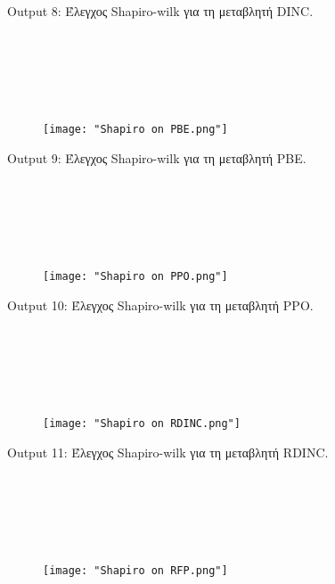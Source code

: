\documentclass[10pt]{article}
\begin{document}
\begin{centering}

\renewcommand{\caption}{Output 8: }
\caption {Έλεγχος Shapiro-wilk για τη μεταβλητή DINC. }
\end{centering}

\

\

\

\begin{figure}[H]
    \centering
    \texttt{[image: "Shapiro on PBE.png"]}
    
    \label{fig:galaxy}
\end{figure}

\begin{centering}

\renewcommand{\caption}{Output 9: }
\caption {Έλεγχος Shapiro-wilk για τη μεταβλητή PBE. }
\end{centering}

\

\

\


\begin{figure}[H]
    \centering
    \texttt{[image: "Shapiro on PPO.png"]}
    
    \label{fig:galaxy}
\end{figure}

\begin{centering}

\renewcommand{\caption}{Output 10: }
\caption {Έλεγχος Shapiro-wilk για τη μεταβλητή PPO. }
\end{centering}

\

\

\
\begin{figure}[H]
    \centering
    \texttt{[image: "Shapiro on RDINC.png"]}
    
    \label{fig:galaxy}
\end{figure}

\begin{centering}

\renewcommand{\caption}{Output 11: }
\caption {Έλεγχος Shapiro-wilk για τη μεταβλητή RDINC. }
\end{centering}

\

\

\

\begin{figure}[H]
    \centering
    \texttt{[image: "Shapiro on RFP.png"]}
    
    \label{fig:galaxy}
\end{figure}
\end{document}
